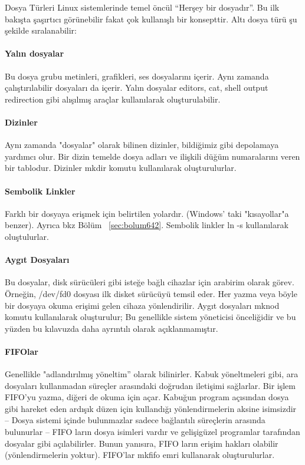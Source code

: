 \begin{section}{Dosya Türleri}
\label{sec:bolum102}
Linux sistemlerinde temel öncül “Herşey bir dosyadır”. Bu ilk bakışta şaşırtıcı görünebilir fakat çok kullanışlı bir konsepttir. Altı dosya türü şu şekilde sıralanabilir:
\paragraph{Yalın dosyalar}{Bu dosya grubu metinleri, grafikleri, ses dosyalarını içerir. Aynı zamanda çalıştırılabilir dosyaları da içerir. Yalın dosyalar editors, cat, shell output redirection gibi alışılmış araçlar kullanılarak oluşturulabilir.}
\paragraph{Dizinler}{Aynı zamanda "dosyalar" olarak bilinen dizinler, bildiğimiz gibi depolamaya yardımcı olur. Bir dizin temelde dosya adları ve ilişkili düğüm numaralarını veren bir tablodur. Dizinler mkdir komutu kullanılarak oluşturulurlar.}
\paragraph{Sembolik Linkler}{ Farklı bir dosyaya erişmek için belirtilen yolardır. (Windows' taki "kısayollar"a benzer). Ayrıca bkz Bölüm ~\ref{sec:bolum642}. Sembolik linkler ln -s kullanılarak oluştulurlar.}
\paragraph{Aygıt Dosyaları}{Bu dosyalar, disk sürücüleri gibi isteğe bağlı cihazlar için arabirim olarak görev. Örneğin, /dev/fd0 dosyası ilk disket sürücüyü temsil eder. Her yazma veya böyle bir dosyaya okuma erişimi gelen cihaza yönlendirilir. Aygıt dosyaları mknod komutu kullanılarak oluşturulur; Bu genellikle sistem yöneticisi önceliğidir ve bu yüzden bu kılavuzda daha ayrıntılı olarak açıklanmamıştır.}
\paragraph{FIFOlar}{Genellikle "adlandırılmış yöneltim” olarak bilinirler. Kabuk yöneltmeleri gibi, ara dosyaları kullanmadan süreçler arasındaki doğrudan iletişimi sağlarlar. Bir işlem FIFO'yu yazma, diğeri de okuma için açar. Kabuğun program açısından dosya gibi hareket eden ardışık düzen için kullandığı yönlendirmelerin aksine isimsizdir -- Dosya sistemi içinde bulunmazlar sadece bağlantılı süreçlerin arasında bulunurlar -- FIFO ların dosya isimleri vardır ve gelişigüzel programlar tarafından dosyalar gibi açılabilirler. Bunun yanısıra, FIFO ların erişim hakları olabilir (yönlendirmelerin yoktur). FIFO'lar mkfifo emri kullanarak oluşturulurlar.}

\end{section}
